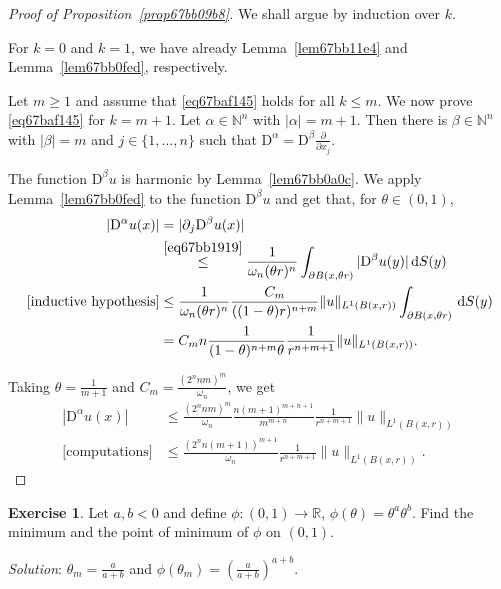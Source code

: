 \documentclass[a4paper,9pt]{amsart}
\newcommand{\N}{\mathbb{N}}	%
\newcommand{\R}{\mathbb{R}}	%
\newcommand{\did}{\,\mathrm{d}}	%
\newcommand{\de}{\partial}		%
\newcommand{\Diff}{\mathrm{D}}
\theoremstyle{plain}
\theoremstyle{definition}
\newtheorem{exercise}[proposition]{Exercise}%
\theoremstyle{remark}
\begin{document}
\begin{proof}[Proof of Proposition~\ref{prop67bb09b8}]
	We shall argue by induction over $k$.
	
	For $k=0$ and $k=1$, we have already Lemma~\ref{lem67bb11e4} and Lemma~\ref{lem67bb0fed}, respectively.
		
	Let $m\ge1$ and assume that \eqref{eq67baf145} holds for all $k\le m$.
	We now prove \eqref{eq67baf145} for $k=m+1$.
	Let $\alpha\in\N^n$ with $|\alpha|=m+1$.
	Then there is $\beta\in\N^n$ with $|\beta|=m$ and $j\in\{1,\dots,n\}$ such that $\Diff^\alpha = \Diff^\beta\frac{\de}{\de x_j}$.
	
	The function $\Diff^\beta u$ is harmonic by Lemma~\ref{lem67bb0a0c}.
	We apply Lemma~\ref{lem67bb0fed} to the function $\Diff^\beta u$ and get that,
	for $\theta\in(0,1)$,
	\begin{align*}
		|\Diff^\alpha u(x)| 
		&= |\de_j \Diff^\beta  u(x)| \\
		&\overset{\eqref{eq67bb1919}}\le \frac{1}{\omega_n  (\theta r)^n} \int_{\de B(x,\theta r)} |\Diff^\beta u(y)| \did S(y) \\
		\text{[inductive hypothesis]}
		&\le \frac{1}{\omega_n  (\theta r)^n}  \frac{C_m}{((1-\theta)r)^{n+m}} \|u\|_{L^1(B(x,r))} \int_{\de B(x,\theta r)} \did S(y) \\
		&= C_m n \frac{1}{(1-\theta)^{n+m}\theta} \frac1{r^{n+m+1}} \|u\|_{L^1(B(x,r))} .
	\end{align*}
	
	Taking $\theta = \frac{1}{m+1}$ and $C_m = \frac{(2^nnm)^m}{\omega_n}$, we get
	\begin{align*}
	|\Diff^\alpha u(x)|
	&\le \frac{(2^nnm)^m}{\omega_n} \frac{ n(m+1)^{m+n+1} }{ m^{m+n} } \frac1{r^{n+m+1}} \|u\|_{L^1(B(x,r))} \\
	\text{[computations]}&\le \frac{(2^nn(m+1))^{m+1}}{\omega_n} \frac1{r^{n+m+1}} \|u\|_{L^1(B(x,r))} .
	\end{align*}
\end{proof}

\begin{exercise}
	Let $a,b<0$ and define $\phi:(0,1)\to\R$, $\phi(\theta) = \theta^a\theta^b$.
	Find the minimum and the point of minimum of $\phi$ on $(0,1)$.
	
	{\it Solution}:
	$\theta_m = \frac{a}{a+b}$ and $\phi(\theta_m)=\left(\frac{a}{a+b}\right)^{a+b}$.
\end{exercise}
\end{document}
